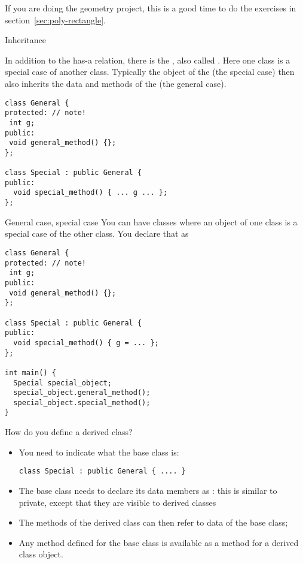 \begin{exercise}
  If you are doing the geometry project, this is a good time to
  do the exercises in section~\ref{sec:poly-rectangle}.
\end{exercise}

 {Inheritance}
\label{sec:inheritance}

In addition to the has-a relation, there is the , also called . Here one class is
a special case of another class.
Typically the object of the  (the special
case) then also inherits the data and methods of the
 (the general case).
\begin{lstlisting}
class General {
protected: // note!
 int g;
public:
 void general_method() {};
};

class Special : public General {
public:
  void special_method() { ... g ... };
};
\end{lstlisting}

\begin{slide}{General case, special case}
  \label{sl:obj-case}
  You can have classes where an object of one class is a special case of
  the other class. You declare that as
\begin{lstlisting}
class General {
protected: // note!
 int g;
public:
 void general_method() {};
};

class Special : public General {
public:
  void special_method() { g = ... };
};

int main() {
  Special special_object;
  special_object.general_method();
  special_object.special_method();
}
\end{lstlisting}
\end{slide}

How do you define a derived class?
\begin{itemize}
\item You need to indicate what the base class is:
\begin{lstlisting}
class Special : public General { .... }
\end{lstlisting}
\item The base class needs to declare its data members as
  : this is similar to private, except that
  they are visible to derived classes
\item The methods of the derived class can then refer to data of the
  base class;
\item Any method defined for the base class is available as a method
  for a derived class object.
\end{itemize}

